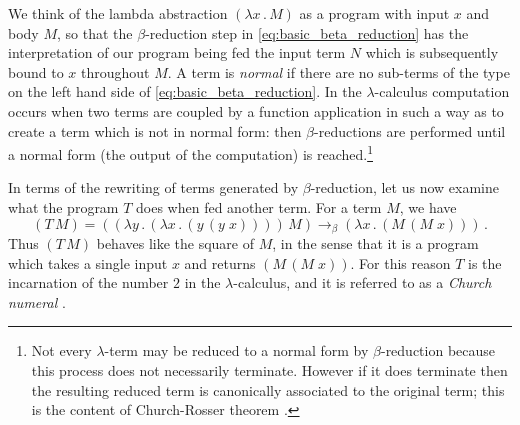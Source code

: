 \documentclass[english,letter paper,12pt,reqno]{article}
\theoremstyle{example}
\numberwithin{equation}{section}
\def\inta{\bold{int}}
\begin{document}
We think of the lambda abstraction $(\lambda x \,.\, M)$ as a program with input $x$ and body $M$, so that the $\beta$-reduction step in \eqref{eq:basic_beta_reduction} has the interpretation of our program being fed the input term $N$ which is subsequently bound to $x$ throughout $M$. A term is \emph{normal} if there are no sub-terms of the type on the left hand side of \eqref{eq:basic_beta_reduction}. In the $\lambda$-calculus computation occurs when two terms are coupled by a function application in such a way as to create a term which is not in normal form: then $\beta$-reductions are performed until a normal form (the output of the computation) is reached.\footnote{Not every $\lambda$-term may be reduced to a normal form by $\beta$-reduction because this process does not necessarily terminate. However if it does terminate then the resulting reduced term is canonically associated to the original term; this is the content of Church-Rosser theorem \cite[\S 4.2]{selinger}.}

In terms of the rewriting of terms generated by $\beta$-reduction, let us now examine what the program $T$ does when fed another term. For a term $M$, we have
\begin{equation}\label{eq:beta_reduc_dup}
(T \, M) = (( \lambda y \,.\, ( \lambda x \,.\, (y \,(y \; x))))\, M) \longrightarrow_\beta (\lambda x \, . \, (M \, (M \; x)))\,.
\end{equation}
Thus $(T \, M)$ behaves like the square of $M$, in the sense that it is a program which takes a single input $x$ and returns $(M \, (M \; x))$. For this reason $T$ is the incarnation of the number $2$ in the $\lambda$-calculus, and it is referred to as a \emph{Church numeral} \cite[\S 3.2]{selinger}.
\end{document}

